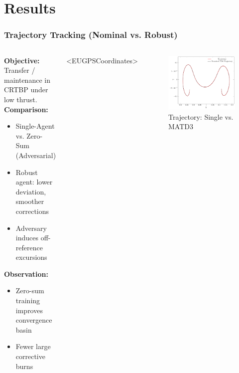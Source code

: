 \section{Results}
\begin{frame}
  \frametitle{Trajectory Tracking (Nominal vs. Robust)}
  \vspace{-0.3cm}
  \begin{columns}[T]
    \begin{column}{0.52\textwidth}
      \textbf{Objective:} Transfer / maintenance in CRTBP under low thrust. \\
      \vspace{2pt}
      \textbf{Comparison:}
      \begin{itemize}\setlength{\itemsep}{3pt}
        \item Single-Agent vs. Zero-Sum (Adversarial)
        \item Robust agent: lower deviation, smoother corrections
        \item Adversary induces off-reference excursions
      \end{itemize}
      \vspace{2pt}
      \textbf{Observation:}
      \begin{itemize}\setlength{\itemsep}{3pt}
        \item Zero-sum training improves convergence basin
        \item Fewer large corrective burns
      \end{itemize}
    \end{column}
    <EUGPSCoordinates>
    \begin{column}{0.48\textwidth}
      \begin{figure}
        \centering
        \includegraphics[width=.95\linewidth]{../../Report/plots/td3/trajectory_force/plot_trajectory}
        \caption{\scriptsize Trajectory: Single vs. MATD3}
      \end{figure}
    \end{column}
  \end{columns}
\end{frame}

